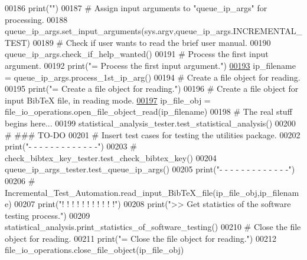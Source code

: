 \begin{DoxyCode}
00186     print(\textcolor{stringliteral}{""})
00187     \textcolor{comment}{# Assign input arguments to "queue\_ip\_args" for processing.}
00188     queue\_ip\_args.set\_input\_arguments(sys.argv,queue\_ip\_args.INCREMENTAL\_TEST)
00189     \textcolor{comment}{# Check if user wants to read the brief user manual.}
00190     queue\_ip\_args.check\_if\_help\_wanted()
00191     \textcolor{comment}{# Process the first input argument.}
00192     print(\textcolor{stringliteral}{"=    Process the first input argument."})
\hypertarget{incremental__test_8py_source_l00193}{}\hyperlink{namespaceincremental__test_ab5a7aa877c2dae060e3fd03a472cbbf3}{00193}     ip\_filename = queue\_ip\_args.process\_1st\_ip\_arg()
00194     \textcolor{comment}{# Create a file object for reading.}
00195     print(\textcolor{stringliteral}{"=    Create a file object for reading."})
00196     \textcolor{comment}{# Create a file object for input BibTeX file, in reading mode.}
\hypertarget{incremental__test_8py_source_l00197}{}\hyperlink{namespaceincremental__test_aaf431f9a2a2d1172f09263453438e4f4}{00197}     ip\_file\_obj = file\_io\_operations.open\_file\_object\_read(ip\_filename)
00198     \textcolor{comment}{# The real stuff begins here...}
00199     statistical\_analysis\_tester.test\_statistical\_analysis()
00200     \textcolor{comment}{#   ### TO-DO}
00201     \textcolor{comment}{# Insert test cases for testing the utilities package.}
00202     print(\textcolor{stringliteral}{"-    -   -   -   -   -   -   -   -   -   -   -   -"})
00203 \textcolor{comment}{#   check\_bibtex\_key\_tester.test\_check\_bibtex\_key()}
00204     queue\_ip\_args\_tester.test\_queue\_ip\_args()
00205     print(\textcolor{stringliteral}{"-    -   -   -   -   -   -   -   -   -   -   -   -"})
00206 \textcolor{comment}{#   Incremental\_Test\_Automation.read\_input\_BibTeX\_file(ip\_file\_obj,ip\_filename)}
00207     print(\textcolor{stringliteral}{"!    !   !   !   !   !   !   !   !   !   !"})
00208     print(\textcolor{stringliteral}{">>   Get statistics of the software testing process."})
00209     statistical\_analysis.print\_statistics\_of\_software\_testing()
00210     \textcolor{comment}{# Close the file object for reading.}
00211     print(\textcolor{stringliteral}{"=    Close the file object for reading."})
00212     file\_io\_operations.close\_file\_object(ip\_file\_obj)
\end{DoxyCode}
